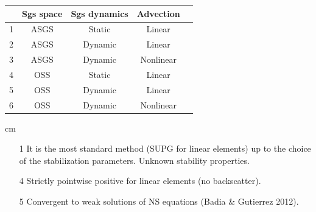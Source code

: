 \begin{frame}[t]
\begin{table}[h]
\centering
\begin{tabular}{|c|c|c|c|c|}
\hline
& Sgs space & Sgs dynamics  &  Advection\\
\hline
1&ASGS      & Static  &  Linear    \\
2&ASGS      & Dynamic &  Linear    \\
3&ASGS      & Dynamic &  Nonlinear \\
\hline
4&OSS      & Static  &  Linear   \\
5&OSS      & Dynamic &  Linear   \\
6&OSS      & Dynamic &  Nonlinear \\
\hline
\end{tabular}
\end{table}
 cm
\begin{itemize}
\item[1] It is the most standard method (SUPG for linear elements) up to the choice of the
stabilization parameters. Unknown stability properties.
\item[4] Strictly pointwise positive for linear elements (no backscatter).
\item[5] Convergent to weak solutions of NS equations (Badia \& Gutierrez 2012).
\end{itemize}
\end{frame}
\addtocounter{framenumber}{-1}

\addtocounter{framenumber}{-1}
